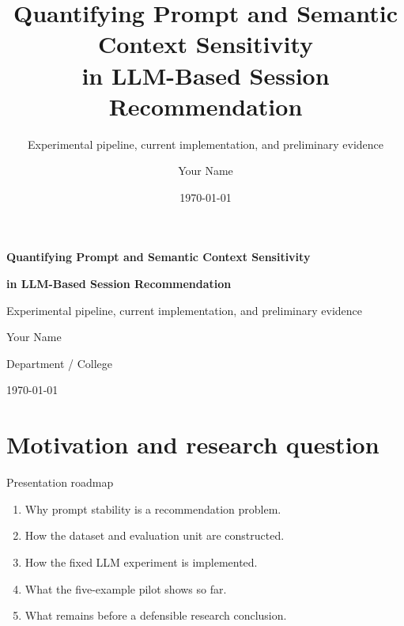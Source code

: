 \documentclass[aspectratio=169,12pt]{beamer}
\title[Prompt \& Context Sensitivity]{Quantifying Prompt and Semantic Context Sensitivity\\in LLM-Based Session Recommendation}
\subtitle{Experimental pipeline, current implementation, and preliminary evidence}
\author{Your Name}
\institute{Department / College}
\date{\today}
\begin{document}
\begin{frame}[plain]
\centering
\vspace{0.6cm}
{\color{DeepBlue}\bfseries\LARGE
Quantifying Prompt and Semantic Context Sensitivity\par}
\vspace{0.25cm}
{\color{DeepBlue}\bfseries\LARGE
in LLM-Based Session Recommendation\par}
\vspace{0.45cm}
{\color{Muted}\large
Experimental pipeline, current implementation, and preliminary evidence\par}
\vfill
{\large Your Name\par}
\vspace{0.15cm}
{\normalsize Department / College\par}
{\normalsize \today\par}
\end{frame}

\section{Motivation and research question}

\begin{frame}{Presentation roadmap}
\begin{enumerate}
  \item Why prompt stability is a recommendation problem.
  \item How the dataset and evaluation unit are constructed.
  \item How the fixed LLM experiment is implemented.
  \item What the five-example pilot shows so far.
  \item What remains before a defensible research conclusion.
\end{enumerate}
\end{frame}
\end{document}
